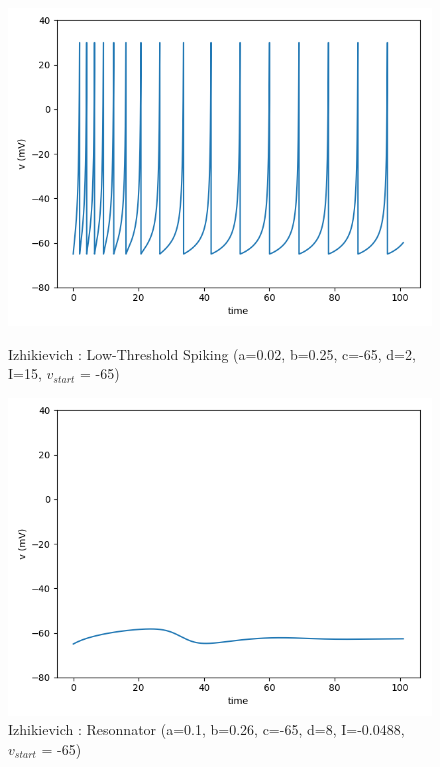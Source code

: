 \documentclass[12pt]{scrartcl}
\begin{document}
\begin{figure}[!h]
\begin{minipage}[l]{.48\linewidth}
\centering
\includegraphics[scale=0.5]{imgs/izLTS.png}
\caption{Izhikievich : Low-Threshold Spiking (a=0.02, b=0.25, c=-65, d=2, I=15, $v_{start}$ = -65)}
\label{izLTS}
\end{minipage}\hfill
\begin{minipage}[l]{.48\linewidth}
\centering
\includegraphics[scale=0.5]{imgs/izRES1.png}
\caption{Izhikievich : Resonnator (a=0.1, b=0.26, c=-65, d=8, I=-0.0488, $v_{start}$ = -65)}
\label{izRES}
\end{minipage}\hfill
\end{figure}
\end{document}
